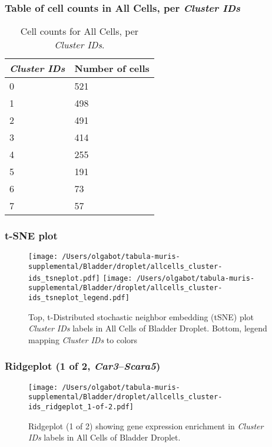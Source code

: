 \subsubsection{Table of cell counts in All Cells, per \emph{Cluster IDs}}\begin{table}[h]
\centering
\label{my-label}
\begin{tabular}{@{}ll@{}}
\toprule

\emph{Cluster IDs}& Number of cells \\ \midrule
0 & 521 \\

1 & 498 \\

2 & 491 \\

3 & 414 \\

4 & 255 \\

5 & 191 \\

6 & 73 \\

7 & 57 \\
\bottomrule
\end{tabular}
\caption{Cell counts for All Cells, per \emph{Cluster IDs}.}
\end{table}

\clearpage
\subsubsection{t-SNE plot}
\begin{figure}[h]
\centering
\texttt{[image: /Users/olgabot/tabula-muris-supplemental/Bladder/droplet/allcells\_cluster-ids\_tsneplot.pdf]}
\texttt{[image: /Users/olgabot/tabula-muris-supplemental/Bladder/droplet/allcells\_cluster-ids\_tsneplot\_legend.pdf]}
\caption{Top, t-Distributed stochastic neighbor embedding (tSNE) plot  \emph{Cluster IDs} labels in All Cells of Bladder Droplet. Bottom, legend mapping \emph{Cluster IDs} to colors}
\end{figure}


\clearpage

\subsubsection{Ridgeplot (1 of 2, \emph{Car3}--\emph{Scara5})}
\begin{figure}[h]
\centering
\texttt{[image: /Users/olgabot/tabula-muris-supplemental/Bladder/droplet/allcells\_cluster-ids\_ridgeplot\_1-of-2.pdf]}

\caption{ Ridgeplot (1 of 2)  showing gene expression enrichment in \emph{Cluster IDs} labels in All Cells of Bladder Droplet. }
\end{figure}


